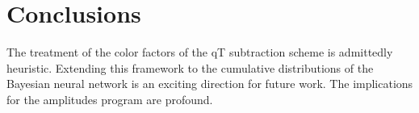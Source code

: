 \section{Conclusions}\label{sec:conclusions}

The treatment of the color factors of the qT subtraction scheme is
admittedly heuristic. Extending this framework to the cumulative
distributions of the Bayesian neural network is an exciting direction
for future work. The implications for the amplitudes program are
profound.

